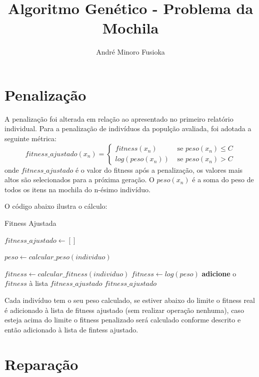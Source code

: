 \documentclass[11pt]{article}
\title{\textbf{Algoritmo Genético - Problema da Mochila}}
\author{André Minoro Fusioka}
\date{}
\begin{document}
\maketitle

\section{Penalização}

A penalização foi alterada em relação ao apresentado no primeiro relatório individual. Para a penalização de indivíduos da populção avaliada, foi adotada a seguinte métrica: 
$$
fitness\_ajustado(x_n) =
\begin{cases}
 fitness(x_n) & \text{ se } peso(x_n) \leq  C \\ 
 log(peso(x_n)) & \text{ se } peso(x_n) >  C 
\end{cases}
$$
onde $fitness\_ajustado$ é o valor do fitness após a penalização, os valores mais altos são selecionados para a próxima geração. O $peso(x_n)$ é a soma do peso de todos os itens na mochila do n-ésimo indivíduo.

O código abaixo ilustra o cálculo:

\begin{algorithm}
	\caption{Fitness Ajustada}\label{euclid}
	\begin{algorithmic}[1]
		
			\State $fitness\_ajustado \gets []$
			
				 \State $peso \gets calcular\_peso(individuo)$
				
					\State $fitness \gets calcular\_fitness(individuo) $
				 \Else
					\State $fitness \gets log(peso)$		 
				\EndIf
				\State \textbf{adicione} o $fitness$ à lista $fitness\_ajustado$
			\State \Return $fitness\_ajustado$
		\EndFunction
	\end{algorithmic}
\end{algorithm}

Cada indivíduo tem o seu peso calculado, se estiver abaixo do limite o fitness real é adicionado à lista de fitness ajustado (sem realizar operação nenhuma), caso esteja acima do limite o fitness penalizado será calculado conforme descrito e então adicionado à lista de fintess ajustado. 

\section{Reparação}
\end{document}
